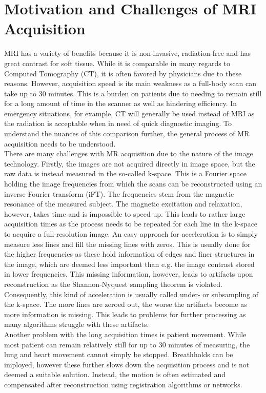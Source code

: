 \section{Motivation and Challenges of MRI Acquisition} \label{Sec:MotivationChallengesMRIAcquisition}
MRI has a variety of benefits because it is non-invasive, radiation-free and has great contrast for soft tissue. While it is comparable in many regards to Computed Tomography (CT), it is often favored by physicians due to these reasons. However, acquisition speed is its main weakness as a full-body scan can take up to 30 minutes. This is a burden on patients due to needing to remain still for a long amount of time in the scanner as well as hindering efficiency. In emergency situations, for example, CT will generally be used instead of MRI as the radiation is acceptable when in need of quick diagnostic imaging. To understand the nuances of this comparison further, the general process of MR acquisition needs to be understood.\\
There are many challenges with MR acquisition due to the nature of the image technology. Firstly, the images are not acquired directly in image space, but the raw data is instead measured in the so-called k-space. This is a Fourier space holding the image frequencies from which the scans can be reconstructed using an inverse Fourier transform (iFT). The frequencies stem from the magnetic resonance of the measured subject. The magnetic excitation and relaxation, however, takes time and is impossible to speed up. This leads to rather large acquisition times as the process needs to be repeated for each line in the k-space to acquire a full-resolution image. An easy approach for acceleration is to simply measure less lines and fill the missing lines with zeros. This is usually done for the higher frequencies as these hold information of edges and finer structures in the image, which are deemed less important than e.g. the image contrast stored in lower frequencies. This missing information, however, leads to artifacts upon reconstruction as the Shannon-Nyquest sampling theorem is violated. Consequently, this kind of acceleration is usually called under- or subsampling of the k-space. The more lines are zeroed out, the worse the artifacts become as more information is missing. This leads to problems for further processing as many algorithms struggle with these artifacts. \\
Another problem with the long acquisition times is patient movement. While most patient can remain relatively still for up to 30 minutes of measuring, the lung and heart movement cannot simply be stopped. Breathholds can be imployed, however these further slows down the acquisition process and is not deemed a suitable solution. Instead, the motion is often estimated and compensated after reconstruction using registration algorithms or networks.

